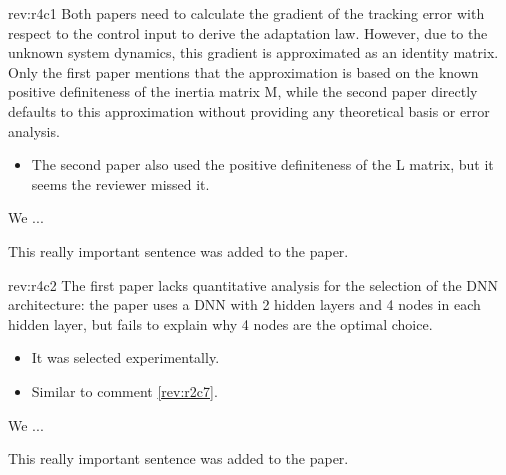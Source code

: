 \documentclass[12pt,english]{reviewresponse}
\begin{document}
\begin{revcomment}[3]{rev:r4c1}
    Both papers need to calculate the gradient of the tracking error with respect to the control input to derive the adaptation law. However, due to the unknown system dynamics, this gradient is approximated as an identity matrix. Only the first paper mentions that the approximation is based on the known positive definiteness of the inertia matrix M, while the second paper directly defaults to this approximation without providing any theoretical basis or error analysis.
\end{revcomment}

\begin{howtoanswer}
    \begin{itemize}
        \item The second paper also used the positive definiteness of the L matrix, but it seems the reviewer missed it.
    \end{itemize}
\end{howtoanswer}

\begin{revresponse}
    We ...
    \begin{changes}
        This really important sentence was added to the paper.
    \end{changes}
\end{revresponse}

\begin{revcomment}[2]{rev:r4c2}
    The first paper lacks quantitative analysis for the selection of the DNN architecture: the paper uses a DNN with 2 hidden layers and 4 nodes in each hidden layer, but fails to explain why 4 nodes are the optimal choice.
\end{revcomment}

\begin{howtoanswer}
    \begin{itemize}
        \item It was selected experimentally.
        \item Similar to comment \cref{rev:r2c7}.
    \end{itemize}
\end{howtoanswer}

\begin{revresponse}
    We ...
    \begin{changes}
        This really important sentence was added to the paper.
    \end{changes}
\end{revresponse}
\end{document}
